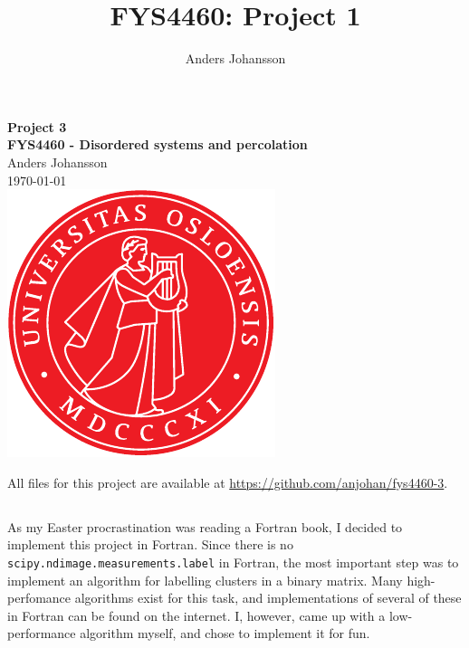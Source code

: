 \documentclass[11pt,british,a4paper]{report}
\begin{document}
\title{FYS4460: Project 1}
\author{Anders Johansson}

\begin{titlepage}
\vspace*{\fill}
\begin{center}
\textsf{
    \Huge \textbf{Project 3}\\\vspace{0.5cm}
    \Large \textbf{FYS4460 - Disordered systems and percolation}\\
    \vspace{8cm}
    Anders Johansson\\
    \today\\
}
\vspace{1.5cm}
\includegraphics{uio.pdf}\\
\vspace*{\fill}
\end{center}
\end{titlepage}
\null
\pagestyle{empty}
\newpage

\pagestyle{fancy}
\setcounter{page}{1}

All files for this project are available at \url{https://github.com/anjohan/fys4460-3}.

%
\subsection{}
As my Easter procrastination was reading a Fortran book\cite{brainerd_guide_2015}, I decided to implement this project in Fortran. Since there is no \lstinline{scipy.ndimage.measurements.label} in Fortran, the most important step was to implement an algorithm for labelling clusters in a binary matrix. Many high-perfomance algorithms exist for this task, and implementations of several of these in Fortran can be found on the internet. I, however, came up with a low-performance algorithm myself, and chose to implement it for fun.
\end{document}
